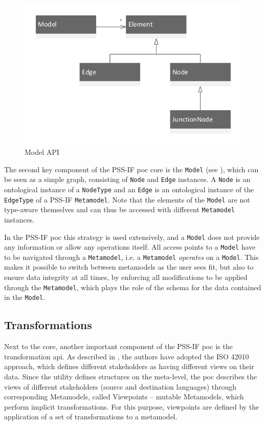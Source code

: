 \begin{figure}
\centering
\includegraphics[scale=0.75]{figures/model.pdf}
\caption{Model API}
\label{fig:model}
\end{figure}

The second key component of the PSS-IF \gls{poc} core is the \texttt{Model} (see ), which can be seen as a simple graph, consisting of \texttt{Node} and \texttt{Edge} instances. A \texttt{Node} is an ontological instance of a \texttt{NodeType} and an \texttt{Edge} is an ontological instance of the \texttt{EdgeType} of a PSS-IF \texttt{Metamodel}. Note that the elements of the \texttt{Model} are not type-aware themselves and can thus be accessed with different \texttt{Metamodel} instances.

In the PSS-IF \gls{poc} this strategy is used extensively, and a \texttt{Model} does not provide any information or allow any operations itself. All access points to a \texttt{Model} have to be navigated through a \texttt{Metamodel}, i.e. a \texttt{Metamodel} \textit{operates} on a \texttt{Model}. This makes it possible to switch between metamodels as the user sees fit, but also to ensure data integrity at all times, by enforcing all modifications to be applied through the \texttt{Metamodel}, which plays the role of the schema for the data contained in the \texttt{Model}.

\subsection{Transformations}

Next to the core, another important component of the PSS-IF \gls{poc} is the transformation \gls{api}. As described in , the authors have adopted the ISO 42010 approach, which defines different stakeholders as having different views on their data. Since the utility defines structures on the meta-level, the \gls{poc} describes the views of different stakeholders (source and destination languages) through corresponding Metamodels, called Viewpoints -- mutable Metamodels, which perform implicit transformations. For this purpose, viewpoints are defined by the application of a set of transformations to a metamodel.

